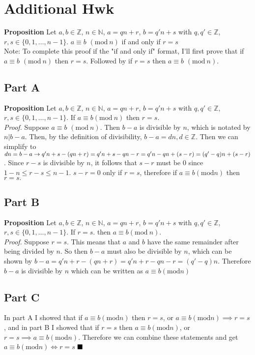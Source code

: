 \documentclass[12pt]{article}
\begin{document}
\begin{minipage}[t]{0.40\textwidth}
	
\section*{Additional Hwk}
\textbf{Proposition}  Let $a,b\in\mathbb{Z}$, $n\in\mathbb{N}$, $a=qn+r$, $b=q'n+s$ with $q,q'\in\mathbb{Z}$, $r,s\in\{0,1,\ldots,n-1\}$.  $a\equiv b$ $(\mathrm{mod}\ n)$ if and only if $r=s$\\
Note: To complete this proof if the "if and only if" format, I'll first prove that if $a\equiv b$ $(\mathrm{mod}\ n)$ then $ r=s $. Followed by if $ r=s $ then $ a\equiv b$ $(\mathrm{mod}\ n). $ 
\subsection*{Part A}
\textbf{Proposition} Let $a,b\in\mathbb{Z}$, $n\in\mathbb{N}$, $a=qn+r$, $b=q'n+s$ with $q,q'\in\mathbb{Z}$, $r,s\in\{0,1,\ldots,n-1\}$. If $ a\equiv b(\mathrm{mod}\ n) $ then $ r=s. $\\
\textit{Proof.} Suppose $a\equiv b$ $(\mathrm{mod}\ n)$. Then $ b-a $ is divisible by $ n $, which is notated by $ n|b-a $. Then, by the definition of divisibility, $ b-a=dn, d\in\mathbb{Z}$. Then we can simplify to $ dn=b-a \newline\rightarrow q'n +s-(qn+r)=q'n +s-qn-r=q'n-qn+(s-r)=(q'-q)n+(s-r)$. Since $ r-s $ is divisible by $ n $, it follows that $ s-r $ must be $ 0 $ since $ 1-n\leq r-s \leq n-1 $. $ s-r=0 $ only if $ r=s $, therefore if $ a\equiv b(\mathrm{mod} n) $ then $ r=s. $ 

	
\end{minipage}
\hfill\vline\hfill
\begin{minipage}[t]{0.45\textwidth}
\subsection*{Part B}
\textbf{Proposition} Let $a,b\in\mathbb{Z}$, $n\in\mathbb{N}$, $a=qn+r$, $b=q'n+s$ with $q,q'\in\mathbb{Z}$, $r,s\in\{0,1,\ldots,n-1\}$. If $ r=s. $ then $a\equiv b(\mathrm{mod}\ n).$\\
\textit{Proof.} Suppose $ r=s $. This means that $ a $ and $ b $ have the same remainder after being divided by $ n $. So then $ b-a $ must also be divisible by $ n $, which can be shown by $ b-a=q'n+r-(qn+r)=q'n+r-qn-r=(q'-q)n. $ Therefore $ b-a $ is divisible by $ n $ which can be written as $ a\equiv b(\mathrm{mod} n) $

\subsection*{Part C}
In part A I showed that if $ a\equiv b(\mathrm{mod} n) $ then $ r=s $, or $a\equiv b(\mathrm{mod} n) \implies r=s $, and in part B I showed that if $ r=s $ then  $ a\equiv b(\mathrm{mod} n) $, or $ r=s \implies a\equiv b(\mathrm{mod} n) .$ Therefore we can combine these statements and get  $ a\equiv b(\mathrm{mod} n)   \Leftrightarrow  r=s$
$\hfill\blacksquare$


\end{minipage}
\pagebreak

\end{document}

